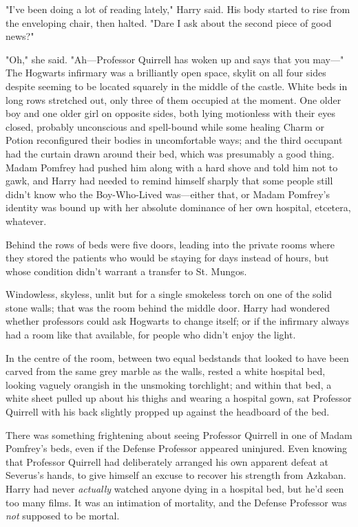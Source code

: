 "I've been doing a lot of reading lately," Harry said. His body started to rise
from the enveloping chair, then halted. "Dare I ask about the second piece of
good news?"

"Oh," she said. "Ah---Professor Quirrell has woken up and says that you may---"
\later
The Hogwarts infirmary was a brilliantly open space, skylit on all four sides
despite seeming to be located squarely in the middle of the castle. White beds
in long rows stretched out, only three of them occupied at the moment. One
older boy and one older girl on opposite sides, both lying motionless with
their eyes closed, probably unconscious and spell-bound while some healing
Charm or Potion reconfigured their bodies in uncomfortable ways; and the third
occupant had the curtain drawn around their bed, which was presumably a good
thing. Madam Pomfrey had pushed him along with a hard shove and told him not to
gawk, and Harry had needed to remind himself sharply that some people still
didn't know who the Boy-Who-Lived was---either that, or Madam Pomfrey's
identity was bound up with her absolute dominance of her own hospital,
etcetera, whatever.

Behind the rows of beds were five doors, leading into the private rooms where
they stored the patients who would be staying for days instead of hours, but
whose condition didn't warrant a transfer to St. Mungos.

Windowless, skyless, unlit but for a single smokeless torch on one of the solid
stone walls; that was the room behind the middle door. Harry had wondered
whether professors could ask Hogwarts to change itself; or if the infirmary
always had a room like that available, for people who didn't enjoy the light.

In the centre of the room, between two equal bedstands that looked to have been
carved from the same grey marble as the walls, rested a white hospital bed,
looking vaguely orangish in the unsmoking torchlight; and within that bed, a
white sheet pulled up about his thighs and wearing a hospital gown, sat
Professor Quirrell with his back slightly propped up against the headboard of
the bed.

There was something frightening about seeing Professor Quirrell in one of Madam
Pomfrey's beds, even if the Defense Professor appeared uninjured. Even knowing
that Professor Quirrell had deliberately arranged his own apparent defeat at
Severus's hands, to give himself an excuse to recover his strength from
Azkaban. Harry had never \emph{actually} watched anyone dying in a hospital
bed, but he'd seen too many films. It was an intimation of mortality, and the
Defense Professor was \emph{not} supposed to be mortal.

